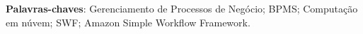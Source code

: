 \documentclass[12pt,openright,twoside,a4paper,english]{abntex2}
\begin{document}
\frenchspacing

\pretextual

\imprimircapa

\imprimirfolhaderosto


\begin{resumo}[Resumo]

 \vspace{\onelineskip}
 \noindent
 \textbf{Palavras-chaves}: Gerenciamento de Processos de Negócio; BPMS; Computação em núvem; SWF; Amazon Simple Workflow Framework.
\end{resumo}

\listoffigures*
\cleardoublepage




\tableofcontents*
\cleardoublepage
\end{document}
